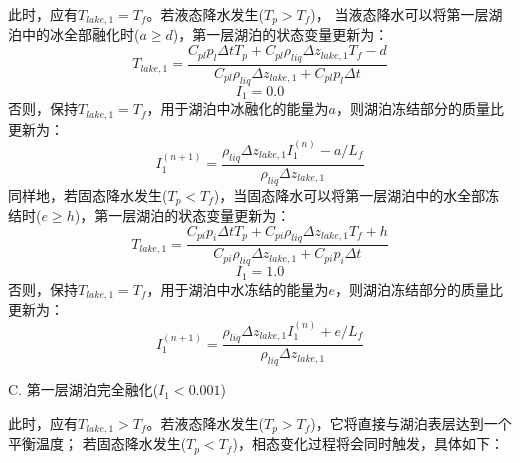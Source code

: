 此时，应有$T_{lake,1}=T_f$。若液态降水发生($T_p>T_f$)，
当液态降水可以将第一层湖泊中的冰全部融化时($a\geqslant d$)，第一层湖泊的状态变量更新为：
\begin{equation}
T_{lake, 1}=\frac{C_{pl} p_{l} \Delta t T_{p}+C_{pl} \rho_{liq} \Delta z_{lake, 1} T_{f}-d}{C_{pl} \rho_{liq} \Delta z_{lake, 1}+C_{pl} p_{l} \Delta t}
\end{equation}
\begin{equation}
I_{1}=0.0
\end{equation}
否则，保持$T_{lake,1}=T_f$，用于湖泊中冰融化的能量为$a$，则湖泊冻结部分的质量比更新为：
\begin{equation}
I_{1}^{(n+1)}=\frac{\rho_{liq} \Delta z_{lake, 1} I_{1}^{(n)}-a / L_{f}}{\rho_{liq} \Delta z_{lake, 1}}
\end{equation}
同样地，若固态降水发生($T_p<T_f$)，当固态降水可以将第一层湖泊中的水全部冻结时($e\geqslant h$)，第一层湖泊的状态变量更新为：
\begin{equation}
T_{lake, 1}=\frac{C_{p i} p_{i} \Delta t T_{p}+C_{p i} \rho_{liq} \Delta z_{lake, 1} T_{f}+h}{C_{p i} \rho_{liq} \Delta z_{lake, 1}+C_{p i} p_{i} \Delta t}
\end{equation}
\begin{equation}
I_{1}=1.0
\end{equation}
否则，保持$T_{lake,1}=T_f$，用于湖泊中水冻结的能量为$e$，则湖泊冻结部分的质量比更新为：
\begin{equation}
I_{1}^{(n+1)}=\frac{\rho_{liq} \Delta z_{lake, 1} I_{1}^{(n)}+e / L_{f}}{\rho_{liq} \Delta z_{lake, 1}}
\end{equation}

C. 	第一层湖泊完全融化($I_1<0.001$)

此时，应有$T_{lake,1}>T_f$。若液态降水发生($T_p>T_f$)，它将直接与湖泊表层达到一个平衡温度；
若固态降水发生($T_p<T_f$)，相态变化过程将会同时触发，具体如下：

